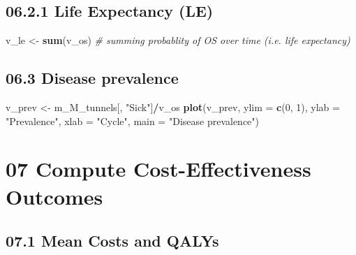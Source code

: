 \documentclass[
]{article}
\newenvironment{Shaded}{\begin{snugshade}}{\end{snugshade}}
\newcommand{\CommentTok}[1]{\textcolor[rgb]{0.56,0.35,0.01}{\textit{#1}}}
\newcommand{\DataTypeTok}[1]{\textcolor[rgb]{0.13,0.29,0.53}{#1}}
\newcommand{\DecValTok}[1]{\textcolor[rgb]{0.00,0.00,0.81}{#1}}
\newcommand{\KeywordTok}[1]{\textcolor[rgb]{0.13,0.29,0.53}{\textbf{#1}}}
\newcommand{\NormalTok}[1]{#1}
\newcommand{\OperatorTok}[1]{\textcolor[rgb]{0.81,0.36,0.00}{\textbf{#1}}}
\newcommand{\StringTok}[1]{\textcolor[rgb]{0.31,0.60,0.02}{#1}}
\begin{document}
\hypertarget{life-expectancy-le}{%
\subsection{06.2.1 Life Expectancy (LE)}\label{life-expectancy-le}}

\begin{Shaded}
\begin{Highlighting}[]
\NormalTok{v_le <-}\StringTok{ }\KeywordTok{sum}\NormalTok{(v_os) }\CommentTok{# summing probablity of OS over time  (i.e. life expectancy)}
\end{Highlighting}
\end{Shaded}

\hypertarget{disease-prevalence}{%
\subsection{06.3 Disease prevalence}\label{disease-prevalence}}

\begin{Shaded}
\begin{Highlighting}[]
\NormalTok{v_prev <-}\StringTok{ }\NormalTok{m_M_tunnels[, }\StringTok{"Sick"}\NormalTok{]}\OperatorTok{/}\NormalTok{v_os}
\KeywordTok{plot}\NormalTok{(v_prev,}
     \DataTypeTok{ylim =} \KeywordTok{c}\NormalTok{(}\DecValTok{0}\NormalTok{, }\DecValTok{1}\NormalTok{),}
     \DataTypeTok{ylab =} \StringTok{"Prevalence"}\NormalTok{,}
     \DataTypeTok{xlab =} \StringTok{"Cycle"}\NormalTok{,}
     \DataTypeTok{main =} \StringTok{"Disease prevalence"}\NormalTok{)}
\end{Highlighting}
\end{Shaded}

\hypertarget{compute-cost-effectiveness-outcomes}{%
\section{07 Compute Cost-Effectiveness
Outcomes}\label{compute-cost-effectiveness-outcomes}}

\hypertarget{mean-costs-and-qalys}{%
\subsection{07.1 Mean Costs and QALYs}\label{mean-costs-and-qalys}}

\begin{Shaded}
\end{Shaded}
\end{document}
